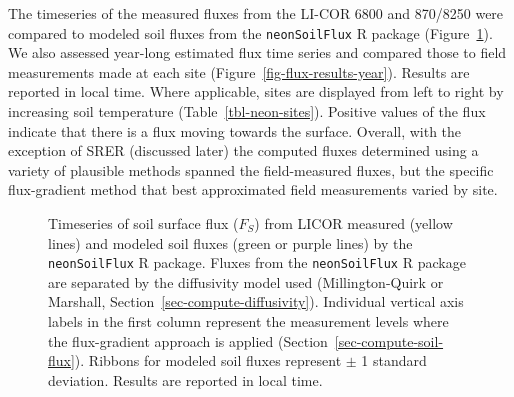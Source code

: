 \documentclass[
  letterpaper,
  DIV=11,
  numbers=noendperiod]{scrartcl}
\begin{document}
The timeseries of the measured fluxes from the LI-COR 6800 and 870/8250
were compared to modeled soil fluxes from the \texttt{neonSoilFlux} R
package (Figure~\ref{fig-flux-results}). We also assessed year-long
estimated flux time series and compared those to field measurements made
at each site (Figure~\ref{fig-flux-results-year}). Results are reported
in local time. Where applicable, sites are displayed from left to right
by increasing soil temperature (Table~\ref{tbl-neon-sites}). Positive
values of the flux indicate that there is a flux moving towards the
surface. Overall, with the exception of SRER (discussed later) the
computed fluxes determined using a variety of plausible methods spanned
the field-measured fluxes, but the specific flux-gradient method that
best approximated field measurements varied by site.

\begin{figure}


\caption{\label{fig-flux-results}Timeseries of soil surface flux
(\(F_{S}\)) from LICOR measured (yellow lines) and modeled soil fluxes
(green or purple lines) by the \texttt{neonSoilFlux} R package. Fluxes
from the \texttt{neonSoilFlux} R package are separated by the
diffusivity model used (Millington-Quirk or Marshall,
Section~\ref{sec-compute-diffusivity}). Individual vertical axis labels
in the first column represent the measurement levels where the
flux-gradient approach is applied (Section~\ref{sec-compute-soil-flux}).
Ribbons for modeled soil fluxes represent \(\pm\) 1 standard deviation.
Results are reported in local time.}

\end{figure}%
\end{document}
